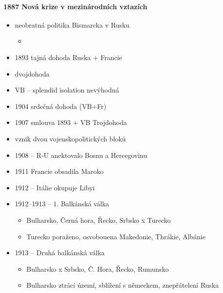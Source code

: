 \paragraph{1887 Nová krize v mezinárodních vztazích}
\begin{itemize}
\item neobratná politika Bismarcka v Rusku
	\begin{itemize}
	\item 
	\end{itemize}
\item 1893 tajná dohoda Ruska + Francie
\item dvojdohoda
\item VB -- splendid isolation nevýhodná
\item 1904 srdečná dohoda (VB+Fr)
\item 1907 smlouva 1893 + VB \ra Trojdohoda
\item vznik dvou vojenskopolitických bloků
\item 1908 -- R-U anektovalo Bosnu a Hercegovinu
\item 1911 Francie obsadila Maroko
\item 1912 -- Itálie okupuje Libyi
\item 1912--1913 -- 1. Balkánská válka
	\begin{itemize}
	\item Bulharsko, Černá hora, Řecko, Srbsko x Turecko
	\item Turecko poraženo, osvobouena Makedonie, Thrákie, Albánie
	\end{itemize}
\item 1913 -- Druhá balkánská válka
	\begin{itemize}
	\item Bulharsko x Srbsko, Č. Hora, Řecko, Rumunsko
	\item Bulharsko ztrácí území, sblížení s německem, znepřátelení Ruska
	\end{itemize}
\end{itemize}







